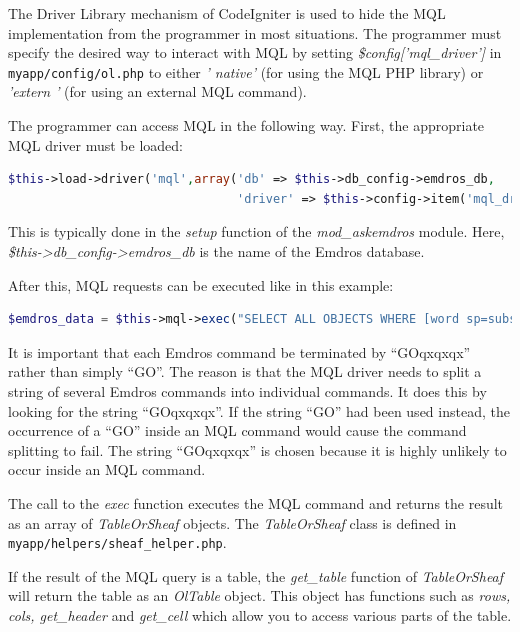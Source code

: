 \documentclass[11pt,oneside,a4paper]{memoir}
\newcommand{\q}{{\mainnolig '}}
\begin{document}
The Driver Library mechanism of CodeIgniter is used to hide the MQL implementation from the
programmer in most situations. The programmer must specify the desired way to interact with MQL by
setting \emph{\$config[\q mql\_driver\q]} in \texttt{myapp/config/ol.php} to either \emph{\q
  native\q} (for using the MQL PHP library) or \emph{\q extern \q} (for using an external MQL
command).

The programmer can access MQL in the following way. First, the appropriate MQL driver must be
loaded:

\begin{lstlisting}[language=PHP]
$this->load->driver('mql',array('db' => $this->db_config->emdros_db,
                                'driver' => $this->config->item('mql_driver')));
\end{lstlisting}

This is typically done in the \emph{setup} function of the \emph{mod\_askemdros} module. Here,
\emph{\$this->db\_config\allowbreak{}->emdros\_db} is the name of the Emdros database.

After this, MQL requests can be executed like in this example:

\begin{lstlisting}[language=PHP]
$emdros_data = $this->mql->exec("SELECT ALL OBJECTS WHERE [word sp=subs GET text] GOqxqxqx");
\end{lstlisting}

It is important that each Emdros command be terminated by ``GOqxqxqx'' rather than simply ``GO''. The
reason is that the MQL driver needs to split a string of several Emdros commands into individual
commands. It does this by looking for the string ``GOqxqxqx''. If the string ``GO'' had been used
instead, the occurrence of a ``GO'' inside an MQL command would cause the command splitting to fail.
The string ``GOqxqxqx'' is chosen because it is highly unlikely to occur inside an MQL command.

The call to the \emph{exec} function executes the MQL command and returns the result as an array of
\emph{TableOrSheaf} objects. The \emph{TableOrSheaf} class is defined in
\texttt{myapp/helpers/sheaf\_helper.php}.

If the result of the MQL query is a table, the \emph{get\_table} function of \emph{TableOrSheaf}
will return the table as an \emph{OlTable} object.  This object has functions
such as \emph{rows, cols, get\_header} and \emph{get\_cell} which allow you to
access various parts of the table.
\end{document}
